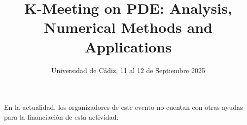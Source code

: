 \documentclass[12pt,a4paper]{article}
\title{K-Meeting on PDE: Analysis, Numerical Methods and Applications}
\date{}
\author{Universidad de Cádiz, {11 al 12 de Septiembre 2025}}
\begin{document}
\maketitle
En la actualidad, los organizadores de este evento no cuentan con otras ayudas para la financiación de esta actividad.
\end{document}
